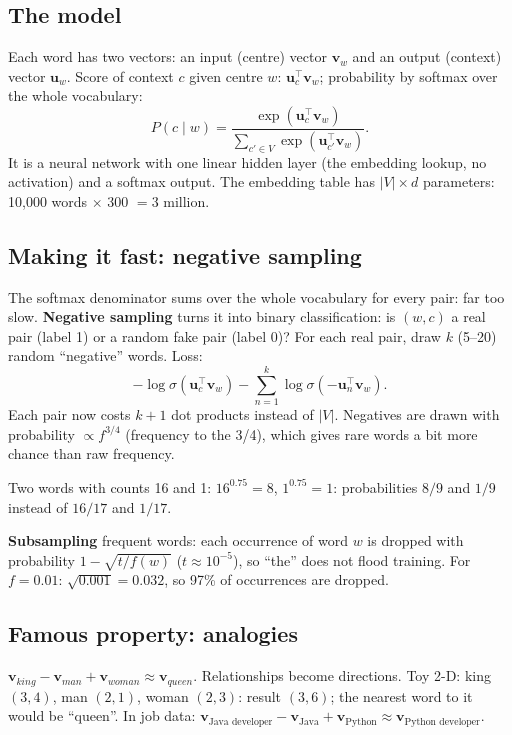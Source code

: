 \subsection{The model}
Each word has two vectors: an input (centre) vector $\mathbf v_w$ and an output (context) vector $\mathbf u_w$. Score of context $c$ given centre $w$:
$\mathbf u_c^\top\mathbf v_w$; probability by softmax over the whole vocabulary:
\[ P(c\mid w) = \frac{\exp(\mathbf u_c^\top\mathbf v_w)}{\sum_{c'\in V}\exp(\mathbf u_{c'}^\top\mathbf v_w)}. \]
It is a neural network with one linear hidden layer (the embedding lookup, no activation) and a softmax output. The embedding table has
$|V|\times d$ parameters: 10{,}000 words $\times$ 300 $= 3$ million.

\subsection{Making it fast: negative sampling}
The softmax denominator sums over the whole vocabulary for every pair: far too slow. \textbf{Negative sampling} turns it into binary
classification: is $(w, c)$ a real pair (label 1) or a random fake pair (label 0)? For each real pair, draw $k$ (5--20) random ``negative''
words. Loss:
\[ -\log\sigma(\mathbf u_c^\top\mathbf v_w) - \sum_{n=1}^k\log\sigma(-\mathbf u_{n}^\top\mathbf v_w). \]
Each pair now costs $k + 1$ dot products instead of $|V|$. Negatives are drawn with probability $\propto f^{3/4}$ (frequency to the 3/4), which
gives rare words a bit more chance than raw frequency.
\begin{example}
Two words with counts 16 and 1: $16^{0.75} = 8$, $1^{0.75} = 1$: probabilities $8/9$ and $1/9$ instead of $16/17$ and $1/17$.
\end{example}
\textbf{Subsampling} frequent words: each occurrence of word $w$ is dropped with probability $1 - \sqrt{t/f(w)}$ ($t\approx10^{-5}$), so ``the''
does not flood training. For $f = 0.01$: $\sqrt{0.001} = 0.032$, so 97\% of occurrences are dropped.

\subsection{Famous property: analogies}
$\mathbf v_{king} - \mathbf v_{man} + \mathbf v_{woman}\approx\mathbf v_{queen}$. Relationships become directions. Toy 2-D: king $(3,4)$, man $(2,1)$,
woman $(2,3)$: result $(3, 6)$; the nearest word to it would be ``queen''. In job data: $\mathbf v_{\text{Java developer}} - \mathbf v_{\text{Java}} +
\mathbf v_{\text{Python}}\approx\mathbf v_{\text{Python developer}}$.

